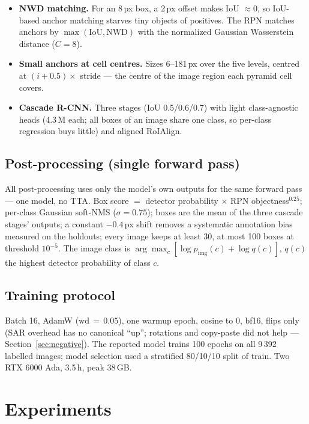 \documentclass[10pt,twocolumn,letterpaper]{article}
\begin{document}
\begin{itemize}[leftmargin=1.1em,itemsep=1pt,topsep=2pt]
\item \textbf{NWD matching.} For an 8\,px box, a 2\,px offset makes IoU
$\approx 0$, so IoU-based anchor matching starves tiny objects of positives.
The RPN matches anchors by $\max(\mathrm{IoU}, \mathrm{NWD})$ with the
normalized Gaussian Wasserstein distance ($C{=}8$).
\item \textbf{Small anchors at cell centres.} Sizes 6--181\,px over the five
levels, centred at $(i{+}0.5)\times$ stride --- the centre of the image region
each pyramid cell covers.
\item \textbf{Cascade R-CNN.} Three stages (IoU 0.5/0.6/0.7) with light
class-agnostic heads (4.3\,M each; all boxes of an image share one class, so
per-class regression buys little) and aligned RoIAlign.
\end{itemize}

\subsection{Post-processing (single forward pass)}
\label{sec:post}
All post-processing uses only the model's own outputs for the same forward
pass --- one model, no TTA. Box score $=$ detector probability $\times$
RPN objectness$^{0.25}$; per-class Gaussian soft-NMS ($\sigma{=}0.75$); boxes
are the mean of the three cascade stages' outputs; a constant $-0.4$\,px shift
removes a systematic annotation bias measured on the holdouts; every image
keeps at least 30, at most 100 boxes at threshold $10^{-5}$. The image class
is $\arg\max_c [\log p_{\mathrm{img}}(c) + \log q(c)]$, $q(c)$ the highest
detector probability of class $c$.

\subsection{Training protocol}
\label{sec:train}
Batch 16, AdamW ($\mathrm{wd}\,{=}\,0.05$), one warmup epoch, cosine to 0,
bf16, flips only (SAR overhead has no canonical ``up''; rotations and
copy-paste did not help --- Section~\ref{sec:negative}). The reported model
trains 100 epochs on all 9\,392 labelled images; model selection used a
stratified 80/10/10 split of train. Two RTX 6000 Ada, 3.5\,h, peak 38\,GB.

\section{Experiments}
\end{document}

